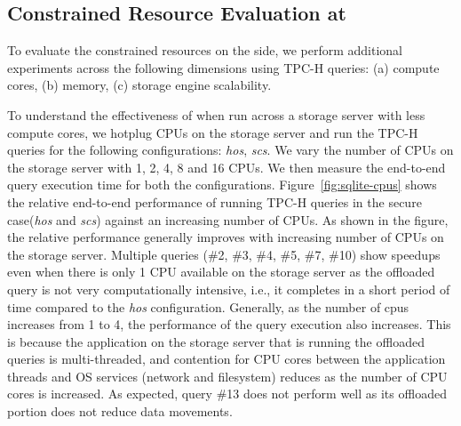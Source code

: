 
 
 \subsection{Constrained Resource Evaluation at \csd}
 \label{subsec:constr-resour-eval}

To evaluate the constrained resources on the \csd side, we perform additional experiments across the following  dimensions using TPC-H queries: (a) compute cores, (b) memory, (c) storage engine scalability. 

  To understand the effectiveness of \project{} when run across a storage server with less compute cores, we hotplug CPUs on the storage server and run the TPC-H queries for the following configurations: \emph{hos}, \emph{scs}. We vary the number of CPUs on the storage server with 1, 2, 4, 8 and 16 CPUs. We then measure the end-to-end query execution time for both the configurations.
 Figure~\ref{fig:sqlite-cpus} shows the relative end-to-end performance of running TPC-H queries in the secure case(\emph{hos} and \emph{scs}) against an increasing number of CPUs. As shown in the figure, the relative performance generally improves with increasing number of CPUs on the storage server. Multiple queries (\#2, \#3, \#4, \#5,  \#7, \#10) show speedups even when there is only 1 CPU available on the storage server as the offloaded query is not very computationally intensive, i.e., it completes in a short period of time compared to the \emph{hos} configuration. Generally, as the number of cpus increases from 1 to 4, the performance of the query execution also increases. This is because the application on the storage server that is running the offloaded queries is multi-threaded, and contention for CPU cores between the application threads and OS services (network and filesystem) reduces as the number of CPU cores is increased. As expected, query \#13 does not perform well as its offloaded portion does not reduce data movements.
 
